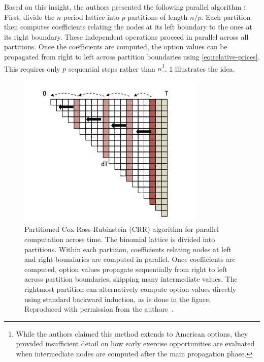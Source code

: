 \documentclass[english,12pt,a4paper,pdftex,sci,utf8]{aaltothesis}
\begin{document}
Based on this insight, the authors presented the following parallel algorithm \cite{ganesan2009acceleration}: First, divide the $n$-period lattice into $p$ partitions of length $n/p$. Each partition then computes coefficients relating the nodes at its left boundary to the ones at its right boundary. These independent operations proceed in parallel across all partitions. Once the coefficients are computed, the option values can be propagated from right to left across partition boundaries using \cref{eq:relative-prices}. This requires only $p$ sequential steps rather than $n$\footnote{While the authors claimed this method extends to American options, they provided insufficient detail on how early exercise opportunities are evaluated when intermediate nodes are computed after the main propagation phase.}. \cref{fig:partitioned} illustrates the idea.

\begin{figure}[h]
    \centering
    \includegraphics[scale=0.6]{External Images/CRRpartitioned.png}
    \caption{Partitioned Cox-Ross-Rubinstein (CRR) algorithm for parallel computation across time. The binomial lattice is divided into partitions. Within each partition, coefficients relating nodes at left and right boundaries are computed in parallel. Once coefficients are computed, option values propagate sequentially from right to left across partition boundaries, skipping many intermediate values. The rightmost partition can alternatively compute option values directly using standard backward induction, as is done in the figure. Reproduced with permission from the authors~\cite{ganesan2009acceleration}.}

    \label{fig:partitioned}
\end{figure}
\end{document}
